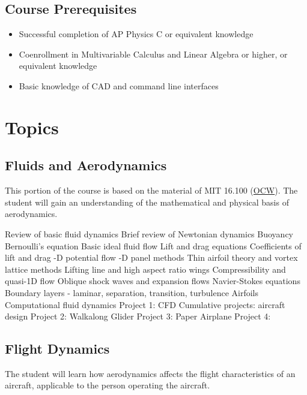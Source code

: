 \documentclass[12pt]{article}
\begin{document}
	\subsection{Course Prerequisites}
		\begin{itemize}
			\item Successful completion of AP Physics C or equivalent knowledge
			\item Coenrollment in Multivariable Calculus and Linear Algebra or higher, or equivalent knowledge
			\item Basic knowledge of CAD and command line interfaces
		\end{itemize}
		\section{Topics}
		\subsection{Fluids and Aerodynamics}
This portion of the course is based on the material of MIT 16.100 (\href{https://ocw.mit.edu/courses/aeronautics-and-astronautics/16-100-aerodynamics-fall-2005/index.htm}{OCW}). The student will gain an understanding of the mathematical and physical basis of aerodynamics. 
		\begin{outline}[enumerate]
			\1 Review of basic fluid dynamics
				\2 Brief review of Newtonian dynamics 
				\2 Buoyancy
				\2 Bernoulli's equation 
				\2 Basic ideal fluid flow 
			\1 Lift and drag equations
				\2 Coefficients of lift and drag
			-D potential flow 
			-D panel methods 
			\1 Thin airfoil theory and vortex lattice methods
			\1 Lifting line and high aspect ratio wings
			\1 Compressibility and quasi-1D flow 
			\1 Oblique shock waves and expansion flows 
			\1 Navier-Stokes equations
			\1 Boundary layers - laminar, separation, transition, turbulence 
			\1 Airfoils
			\1 Computational fluid dynamics 
				\2 Project 1: CFD
			\1 Cumulative projects: aircraft design
				\2 Project 2: Walkalong Glider
				\2 Project 3: Paper Airplane 
				\2 Project 4: 
		\end{outline}
	\subsection{Flight Dynamics}
		The student will learn how aerodynamics affects the flight characteristics of an aircraft, applicable to the person operating the aircraft. \\
\end{document}
